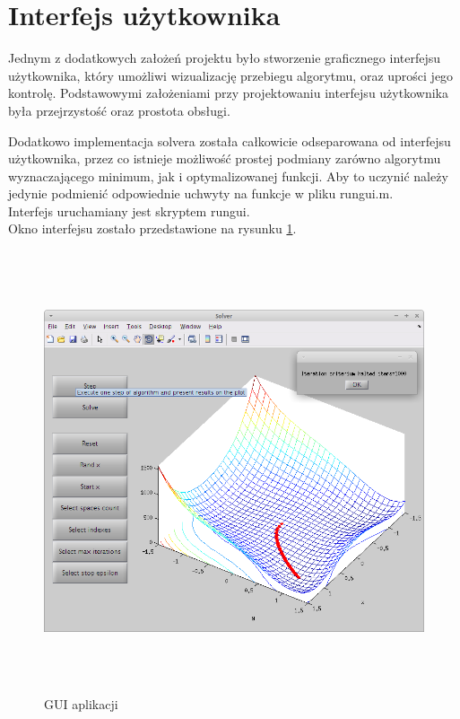 \documentclass[12pt]{article}
\begin{document}
\section*{Interfejs użytkownika}

Jednym z dodatkowych założeń projektu było stworzenie graficznego interfejsu
użytkownika, który umożliwi wizualizację przebiegu algorytmu, oraz uprości jego
kontrolę. Podstawowymi założeniami przy projektowaniu interfejsu użytkownika
była przejrzystość oraz prostota obsługi.

Dodatkowo implementacja solvera została całkowicie odseparowana od interfejsu
użytkownika, przez co istnieje możliwość prostej podmiany zarówno algorytmu
wyznaczającego minimum, jak i optymalizowanej funkcji. Aby to uczynić należy
jedynie podmienić odpowiednie uchwyty na funkcje w pliku rungui.m.
\\

\noindent
Interfejs uruchamiany jest skryptem rungui.\\

\noindent
Okno interfejsu zostało przedstawione na rysunku \ref{img:gui1}.

\begin{figure}[!htb]
    \begin{center}
        \includegraphics[height=13cm]{../res/img/gui_snap_solve.png}
    \end{center}
    \caption{GUI aplikacji}\label{img:gui1}
\end{figure}
\end{document}
